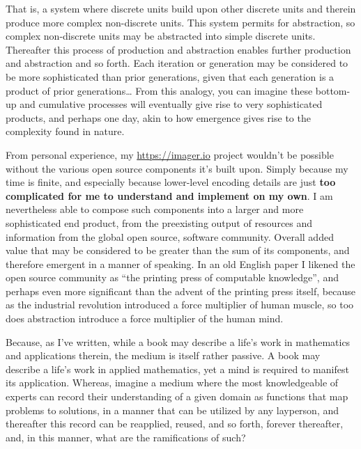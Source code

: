 That is, a system where discrete units build upon other discrete units and therein produce more complex non-discrete units. This system permits for abstraction, so complex non-discrete units may be abstracted into simple discrete units. Thereafter this process of production and abstraction enables further production and abstraction and so forth. Each iteration or generation may be considered to be more sophisticated than prior generations, given that each generation is a product of prior generations… From this analogy, you can imagine these bottom-up and cumulative processes will eventually give rise to very sophisticated products, and perhaps one day, akin to how emergence gives rise to the complexity found in nature.

From personal experience, my \url{https://imager.io} project wouldn’t be possible without the various open source components it’s built upon. Simply because my time is finite, and especially because lower-level encoding details are just \textbf{too complicated for me to understand and implement on my own}. I am nevertheless able to compose such components into a larger and more sophisticated end product, from the preexisting output of resources and information from the global open source, software community. Overall added value that may be considered to be greater than the sum of its components, and therefore emergent in a manner of speaking. In an old English paper I likened the open source community as ``the printing press of computable knowledge'', and perhaps even more significant than the advent of the printing press itself, because as the industrial revolution introduced a force multiplier of human muscle, so too does abstraction introduce a force multiplier of the human mind.

Because, as I've written, while a book may describe a life’s work in mathematics and applications therein, the medium is itself rather passive. A book may describe a life’s work in applied mathematics, yet a mind is required to manifest its application. Whereas, imagine a medium where the most knowledgeable of experts can record their understanding of a given domain as functions that map problems to solutions, in a manner that can be utilized by any layperson, and thereafter this record can be reapplied, reused, and so forth, forever thereafter, and, in this manner, what are the ramifications of such?



